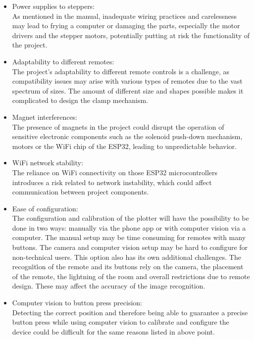 \begin{itemize}
    \item Power supplies to steppers:\\
        As mentioned in the manual, inadequate wiring practices and carelessness may lead to frying a computer or damaging the parts, especially the motor drivers and the stepper motors, potentially putting at risk the functionality of the project.
    \item Adaptability to different remotes:\\
        The project's adaptability to different remote controls is a challenge, as compatibility issues may arise with various types of remotes due to the vast spectrum of sizes. The amount of different size and shapes possible makes it complicated to design the clamp mechanism. 
    \item Magnet interferences:\\
        The presence of magnets in the project could disrupt the operation of sensitive electronic components such as the solenoid push-down mechanism, motors or the WiFi chip of the ESP32, leading to unpredictable behavior.
    \item WiFi network stability:\\
        The reliance on WiFi connectivity on those ESP32 microcontrollers introduces a risk related to network instability, which could affect communication between project components.
    \item Ease of configuration:\\
        The configuration and calibration of the plotter will have the possibility to be done in two ways: manually via the phone app or with computer vision via a computer. The manual setup may be time consuming for remotes with many buttons. 
        The camera and computer vision setup may be hard to configure for non-technical users. This option also has its own additional challenges. The recogni̇ti̇on of the remote and its buttons rely on the camera, the placement of the remote, the lightning of the room
        and overall restrictions due to remote design. These may affect the accuracy of the image recognition.
    \item Computer vision to button press precision:\\
        Detecting the correct position and therefore being able to guarantee a precise button press while using computer vision to calibrate and configure the device could be difficult for the same reasons listed in above point.
\end{itemize}
